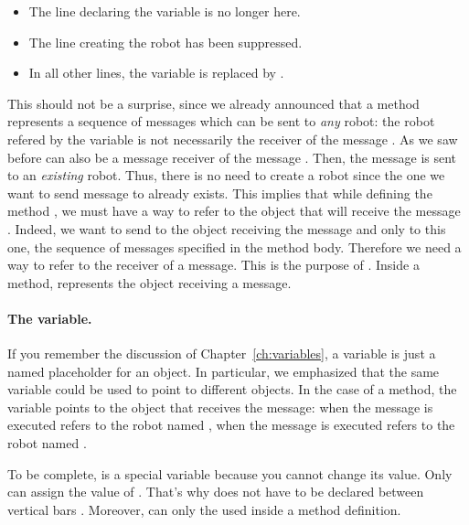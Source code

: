 \begin{itemize}
\item The line declaring the variable \caro is no longer here.
\item The line creating the robot has been suppressed.
\item In all other lines, the variable \caro is replaced by \self.
\end{itemize}

This should not be a surprise, since we already announced that a
method represents a sequence of messages which can be sent to
\emph{any} robot: the robot refered by the variable \caro is not necessarily the
receiver of the message . As we saw before \daly can also be a message receiver
of the message . Then, the message  is sent to an \emph{existing}
robot. Thus, there is no need to create a robot since the one we want to send message to already
exists. This implies that while defining the method , we must have a way to refer to the object that will receive the message .  Indeed, we want to send to the object
receiving the message  and only to this one, the sequence of
messages specified in the method body. Therefore we need a way to refer to the receiver of a message.  This is the purpose of \self. Inside a method, \self represents the object receiving a  message.

\paragraph{The \self variable.}
If you remember the discussion of Chapter~\ref{ch:variables}, a
variable is just a named placeholder for an object. In particular, we emphasized 
that the same variable could be used to point to different objects. 
In the case of a method, the variable \self points to the object that receives the message: when the message  is executed \self refers to the robot named \caro, when the
message  is executed \self refers to the robot named \daly.

To be complete, \self is a special variable because you cannot change its value. Only \sq can assign the value of \self. That's why \self does not have to be declared between vertical bars \ct{|}. Moreover, \self can only the used inside a method definition.



